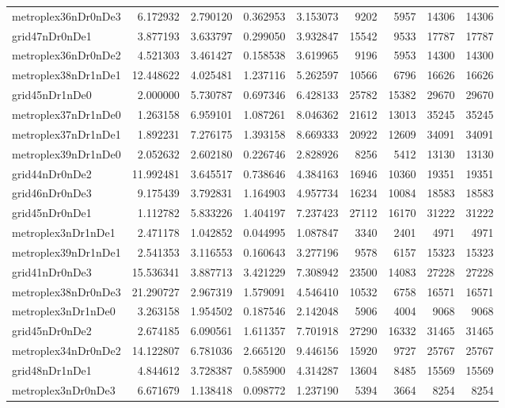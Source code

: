 \begin{longtable}{|l|r|r|r|r|r|r|r|r|}
metroplex36nDr0nDe3 & 6.172932 & 2.790120 & 0.362953 & 3.153073 & 9202 & 5957 & 14306 & 14306 \\
grid47nDr0nDe1 & 3.877193 & 3.633797 & 0.299050 & 3.932847 & 15542 & 9533 & 17787 & 17787 \\
metroplex36nDr0nDe2 & 4.521303 & 3.461427 & 0.158538 & 3.619965 & 9196 & 5953 & 14300 & 14300 \\
metroplex38nDr1nDe1 & 12.448622 & 4.025481 & 1.237116 & 5.262597 & 10566 & 6796 & 16626 & 16626 \\
grid45nDr1nDe0 & 2.000000 & 5.730787 & 0.697346 & 6.428133 & 25782 & 15382 & 29670 & 29670 \\
metroplex37nDr1nDe0 & 1.263158 & 6.959101 & 1.087261 & 8.046362 & 21612 & 13013 & 35245 & 35245 \\
metroplex37nDr1nDe1 & 1.892231 & 7.276175 & 1.393158 & 8.669333 & 20922 & 12609 & 34091 & 34091 \\
metroplex39nDr1nDe0 & 2.052632 & 2.602180 & 0.226746 & 2.828926 & 8256 & 5412 & 13130 & 13130 \\
grid44nDr0nDe2 & 11.992481 & 3.645517 & 0.738646 & 4.384163 & 16946 & 10360 & 19351 & 19351 \\
grid46nDr0nDe3 & 9.175439 & 3.792831 & 1.164903 & 4.957734 & 16234 & 10084 & 18583 & 18583 \\
grid45nDr0nDe1 & 1.112782 & 5.833226 & 1.404197 & 7.237423 & 27112 & 16170 & 31222 & 31222 \\
metroplex3nDr1nDe1 & 2.471178 & 1.042852 & 0.044995 & 1.087847 & 3340 & 2401 & 4971 & 4971 \\
metroplex39nDr1nDe1 & 2.541353 & 3.116553 & 0.160643 & 3.277196 & 9578 & 6157 & 15323 & 15323 \\
grid41nDr0nDe3 & 15.536341 & 3.887713 & 3.421229 & 7.308942 & 23500 & 14083 & 27228 & 27228 \\
metroplex38nDr0nDe3 & 21.290727 & 2.967319 & 1.579091 & 4.546410 & 10532 & 6758 & 16571 & 16571 \\
metroplex3nDr1nDe0 & 3.263158 & 1.954502 & 0.187546 & 2.142048 & 5906 & 4004 & 9068 & 9068 \\
grid45nDr0nDe2 & 2.674185 & 6.090561 & 1.611357 & 7.701918 & 27290 & 16332 & 31465 & 31465 \\
metroplex34nDr0nDe2 & 14.122807 & 6.781036 & 2.665120 & 9.446156 & 15920 & 9727 & 25767 & 25767 \\
grid48nDr1nDe1 & 4.844612 & 3.728387 & 0.585900 & 4.314287 & 13604 & 8485 & 15569 & 15569 \\
metroplex3nDr0nDe3 & 6.671679 & 1.138418 & 0.098772 & 1.237190 & 5394 & 3664 & 8254 & 8254 \\

\end{longtable}
